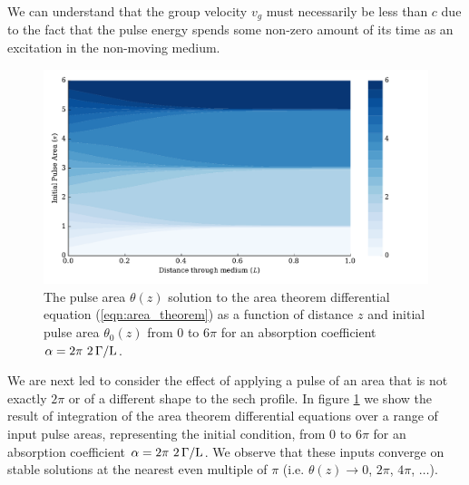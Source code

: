     We can understand that the group velocity $v_g$ must necessarily be less
    than $c$ due to the fact that the pulse energy spends some non-zero amount
    of its time as an excitation in the non-moving medium.

    \begin{figure}[]
      \includegraphics[width=\linewidth]
        {figs/03_nonlinear/plot_area_theorem_cmap_fig1.pdf}
      \caption{
        The pulse area $\theta(z)$ solution to the area theorem differential
        equation (\ref{eqn:area_theorem}) as a function of distance $z$ and
        initial pulse area $\theta_0(z)$ from $0$ to $6\pi$ for an absorption
        coefficient $\alpha =  \unit[2\pi~2]{\Gamma/L}$.
      }
      \label{fig:area_theorem_cmap}
    \end{figure}

    We are next led to consider the effect of applying a pulse of an area that
    is not exactly $2\pi$ or of a different shape to the sech profile. In figure
    \ref{fig:area_theorem_cmap} we show the result of integration of the area
    theorem differential equations over a range of input pulse areas,
    representing the initial condition, from $0$ to $6\pi$ for an absorption
    coefficient $\alpha =  \unit[2\pi~2]{\Gamma/L}$. We observe that these
    inputs converge on stable solutions at the nearest even multiple of $\pi$
    (i.e. $\theta(z) \rightarrow 0$, $2\pi$, $4\pi$, $\dots$).

